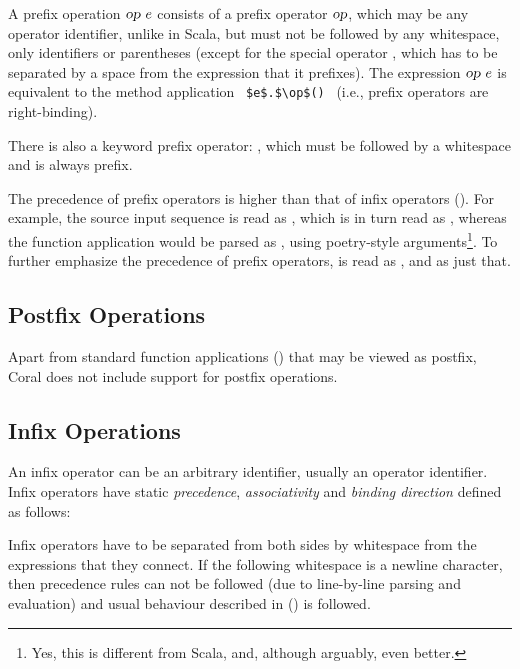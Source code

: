 A prefix operation $\mbox{\sl op}\ e$ consists of a prefix operator $\mbox{\sl op}$, which may be any operator identifier, unlike in Scala, but must not be followed by any whitespace, only identifiers or parentheses (except for the special operator , which has to be separated by a space from the expression that it prefixes). The expression $\mbox{\sl op}\ e$ is equivalent to the method application ~\lstinline!$e$.$\op$()!~ (i.e., prefix operators are right-binding). 

There is also a keyword prefix operator: , which must be followed by a whitespace and is always prefix.

The precedence of prefix operators is higher than that of infix operators (). For example, the source input sequence  is read as , which is in turn read as , whereas the function application  would be parsed as , using poetry-style arguments\footnote{Yes, this is different from Scala, and, although arguably, even better.}. To further emphasize the precedence of prefix operators,  is read as , and  as just that. 





\subsection{Postfix Operations}

Apart from standard function applications () that may be viewed as postfix, Coral does not include support for postfix operations. 





\subsection{Infix Operations}
\label{sec:infix-operations}

An infix operator can be an arbitrary identifier, usually an operator identifier. Infix operators have static {\em precedence}, {\em associativity} and {\em binding direction} defined as follows:

Infix operators have to be separated from both sides by whitespace from the expressions that they connect. If the following whitespace is a newline character, then precedence rules can not be followed (due to line-by-line parsing and evaluation) and usual behaviour described in () is followed. 

